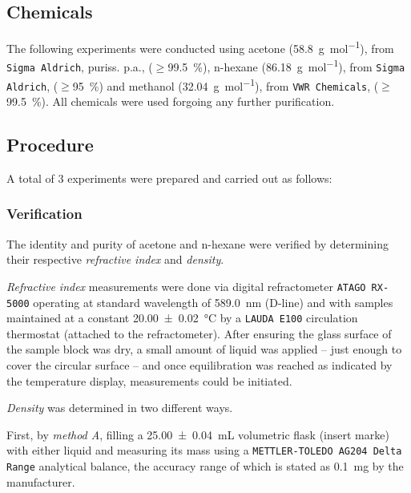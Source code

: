 


\subsection{Chemicals}
The following experiments were conducted using acetone (\qty{58.8}{\gram\per\mole}), from \texttt{Sigma Aldrich}, puriss. p.a., ($\geq$\qty{99.5}{\percent}), n-hexane (\qty{86.18}{\gram\per\mole}), from \texttt{Sigma Aldrich}, ($\geq$\qty{95}{\percent}) and methanol (\qty{32.04}{\gram\per\mole}), from \texttt{VWR Chemicals}, ($\geq$\qty{99.5}{\percent}). All chemicals were used forgoing any further purification.

\subsection{Procedure}
A total of 3 experiments were prepared and carried out as follows:

\subsubsection{Verification}

The identity and purity of acetone and n-hexane were verified by determining their respective \textit{refractive index} and \textit{density}. 

\textit{Refractive index} measurements were done via digital refractometer \texttt{ATAGO RX-5000} operating at standard wavelength of \qty{589.0}{\nano\meter} (D-line) and with samples maintained at a constant \qty{20.00 \pm 0.02}{\celsius} by a \texttt{LAUDA E100} circulation thermostat (attached to the refractometer). After ensuring the glass surface of the sample block was dry, a small amount of liquid was applied – just enough to cover the circular surface – and once equilibration was reached as indicated by the temperature display, measurements could be initiated.

\textit{Density} was determined in two different ways.

First, by \textit{method A}, filling a \qty{25.00 \pm 0.04}{\milli\liter} volumetric flask (insert marke) with either liquid and measuring its mass using a \texttt{METTLER-TOLEDO AG204 Delta Range} analytical balance, the accuracy range of which is stated as \qty{0.1}{\milli\gram} by the manufacturer.

